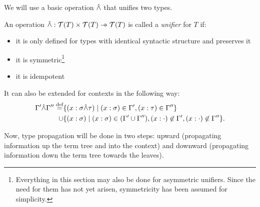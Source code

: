 \documentclass[main.tex]{subfiles}
\begin{document}
We will use a basic operation $\hat{\wedge}$ that unifies two types.

\begin{defn}
An operation $ \unify : \tclos{T} \times \tclos{T} \pfun \tclos{T}$ is
called a \emph{unifier} for $T$ if:
\begin{itemize}
    \item it is only defined for types with identical syntactic structure and
        preserves it
    \item it is symmetric\footnote{
            Everything in this section may also be done for asymmetric unifiers.
            Since the need for them has not yet arisen, symmetricity has been
            assumed for simplicity.
        }
    \item it is idempotent
\end{itemize}
\end{defn}


It can also be extended for contexts in the following way:
\[
    \begin{split}
        \Gamma' \hat{\wedge} \Gamma'' \overset{\text{\scriptsize def}}{=}
        &\{ (x : \sigma \hat{\wedge} \tau) \mid (x : \sigma) \in \Gamma', (x : \tau) \in \Gamma''\} \\
        \cup &
        \{ (x : \sigma) \mid (x : \sigma) \in (\Gamma' \cup \Gamma''),
            (x : \cdot) \not\in \Gamma',
            (x : \cdot) \not\in \Gamma'' \}. \\
    \end{split}
\]

Now, type propagation will be done in two steps: upward (propagating
information up the term tree and into the context) and downward (propagating
information down the term tree towards the leaves).
\end{document}
